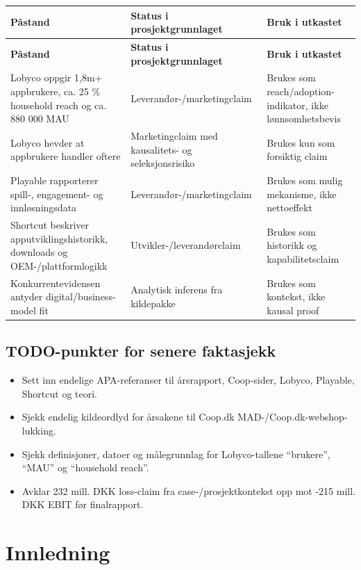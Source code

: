 \documentclass[12pt,a4paper]{article}
\begin{document}
\begin{longtable}{p{} p{} p{}}
\toprule
\textbf{Påstand} & \textbf{Status i prosjektgrunnlaget} & \textbf{Bruk i utkastet} \\
\midrule
\endfirsthead
\toprule
\textbf{Påstand} & \textbf{Status i prosjektgrunnlaget} & \textbf{Bruk i utkastet} \\
\midrule
\endhead
Lobyco oppgir 1,8m+ appbrukere, ca. 25 \% household reach og ca. 880 000 MAU & Leverandør-/marketingclaim & Brukes som reach/adoption-indikator, ikke lønnsomhetsbevis \\
Lobyco hevder at appbrukere handler oftere & Marketingclaim med kausalitets- og seleksjonsrisiko & Brukes kun som forsiktig claim \\
Playable rapporterer spill-, engagement- og innløsningsdata & Leverandør-/marketingclaim & Brukes som mulig mekanisme, ikke nettoeffekt \\
Shortcut beskriver apputviklingshistorikk, downloads og OEM-/plattformlogikk & Utvikler-/leverandørclaim & Brukes som historikk og kapabilitetsclaim \\
Konkurrentevidensen antyder digital/business-model fit & Analytisk inferens fra kildepakke & Brukes som kontekst, ikke kausal proof \\
\bottomrule
\end{longtable}

\subsection*{TODO-punkter for senere faktasjekk}

\begin{itemize}
  \item Sett inn endelige APA-referanser til årsrapport, Coop-sider, Lobyco, Playable, Shortcut og teori.
  \item Sjekk endelig kildeordlyd for årsakene til Coop.dk MAD-/Coop.dk-webshop-lukking.
  \item Sjekk definisjoner, datoer og målegrunnlag for Lobyco-tallene ``brukere'', ``MAU'' og ``household reach''.
  \item Avklar 232 mill. DKK loss-claim fra case-/prosjektkontekst opp mot -215 mill. DKK EBIT før finalrapport.
\end{itemize}

\section{Innledning}
\end{document}
